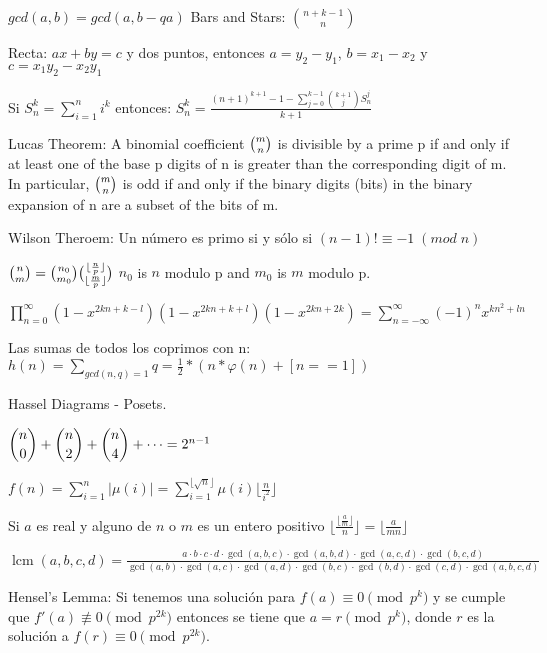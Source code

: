 {\normalsize
    $ gcd(a,b) = gcd(a, b-qa)$
    \hspace{4em} Bars and Stars: $ \binom{n+k-1}{n} $
    
    Recta: $ax + by = c$ y dos puntos, entonces $a = y_2-y_1$, $b = x_1-x_2$ y $c = x_1y_2-x_2y_1$
    
    Si $S_{n}^{k} = \sum_{i=1}^{n} i^k$ entonces: $S_{n}^{k} = \frac{ (n+1)^{k+1} - 1 - \sum_{j=0}^{k-1} {{k+1} \choose j} S_n^j }{ k+1 }$

    Lucas Theorem: A binomial coefficient ${\tbinom {m}{n}}$ is divisible by a prime p if and only if at least one of the base p digits of n is greater than the corresponding digit of m.
    In particular, ${\displaystyle {\tbinom {m}{n}}}$ is odd if and only if the binary digits (bits) in the binary expansion of n are a subset of the bits of m.

    Wilson Theroem: Un número es primo si y sólo si $(n-1)! \equiv -1 \; (mod \; n)$

    ${\tbinom {n}{m}} = {\tbinom {n_0}{m_0}} {\tbinom {\lfloor \frac{n}{p} \rfloor }{\lfloor \frac{m}{p} \rfloor}}$ $n_0$ is $n$ modulo p and $m_0$ is $m$ modulo p.

    $\displaystyle\prod_{n=0}^{\infty} (1-x^{2kn+k-l})(1-x^{2kn+k+l})(1-x^{2kn+2k}) = \displaystyle\sum_{n=-\infty}^{\infty}(-1)^nx^{kn^2+ln}$

    Las sumas de todos los coprimos con n: $\displaystyle h(n) = \sum_{gcd(n,q)=1} q = \frac{1}{2} * (n  * \varphi(n) + [n==1])$

    Hassel Diagrams - Posets.

    $\dbinom n 0 + \dbinom n 2 + \dbinom n 4 + \dotsb = 2^{n - 1}$

    $\displaystyle f(n) = \sum_{i=1}^{n} |\mu(i)| = \sum_{i=1}^{  \lfloor \sqrt{n} \rfloor} \mu(i) \lfloor \frac{n}{i^2} \rfloor$

    Si $a$ es real y alguno de $n$ o $m$ es un entero positivo $\displaystyle \lfloor \frac{\lfloor \frac{a}{m} \rfloor }{n} \rfloor = \lfloor \frac{a}{mn} \rfloor$

    $ \operatorname{lcm}(a,b,c,d)=\frac{a\cdot b\cdot c\cdot d\cdot\operatorname{gcd}(a,b,c)\cdot\operatorname{gcd}(a,b,d)\cdot\operatorname{gcd}(a,c,d)\cdot\operatorname{gcd}(b,c,d)}{\operatorname{gcd}(a,b)\cdot\operatorname{gcd}(a,c)\cdot\operatorname{gcd}(a,d)\cdot\operatorname{gcd}(b,c)\cdot\operatorname{gcd}(b,d)\cdot\operatorname{gcd}(c,d)\cdot\operatorname{gcd}(a,b,c,d)} $

    Hensel's Lemma: Si tenemos una solución para $f(a) \equiv 0 \pmod{p^k}$ y se cumple que $f'(a) \not\equiv 0 \pmod{p^{2k}}$ entonces se tiene que $a = r \pmod{p^k}$, donde $r$ es la solución a $f(r) \equiv 0 \pmod{p^{2k}}$.

}
